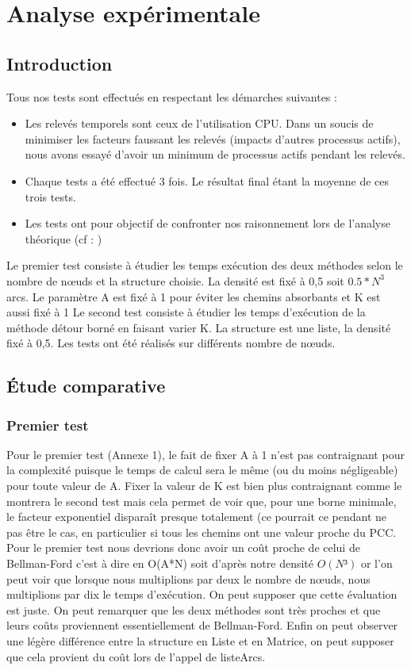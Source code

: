 \chapter{Analyse expérimentale}
\section{Introduction}
Tous nos tests sont effectués en respectant les démarches suivantes : 
\begin{itemize}
\item
Les relevés temporels sont ceux de l'utilisation CPU. Dans un soucis de minimiser les facteurs faussant les relevés (impacts d'autres processus actifs), nous avons essayé d'avoir un minimum de processus actifs pendant les relevés.
\item
Chaque tests a été effectué 3 fois. Le résultat final étant la moyenne de ces trois tests.
\item
Les tests ont pour objectif de confronter nos raisonnement lors de l'analyse théorique (cf : )

\end{itemize}
Le premier test consiste à étudier les temps exécution des deux méthodes selon le nombre de nœuds et la structure choisie. La densité est fixé à 0,5 soit $0.5*N^3$ arcs. Le paramètre A est fixé à 1 pour éviter les chemins absorbants et K est aussi fixé à 1
Le second test consiste à étudier les temps d'exécution de la méthode détour borné en faisant varier K. La structure est une liste, la densité fixé à 0,5. Les tests ont été réalisés sur différents nombre de nœuds.
\section{Étude comparative}
\subsection{Premier test}
Pour le premier test (Annexe 1), le fait de fixer A à 1 n'est pas contraignant pour la complexité puisque le temps de calcul sera le même (ou du moins négligeable) pour toute valeur de A. Fixer la valeur de K est bien plus contraignant comme le montrera le second test mais cela permet de voir que, pour une borne minimale, le facteur exponentiel disparaît presque totalement (ce pourrait ce pendant ne pas être le cas, en particulier si tous les chemins ont une valeur proche du PCC. Pour le premier test nous devrions donc avoir un coût proche de celui de Bellman-Ford c'est à dire en O(A*N) soit d'après notre densité $O(N³)$ or l'on peut voir que lorsque nous multiplions par deux le nombre de nœuds, nous multiplions par dix le temps d'exécution. On peut supposer que cette évaluation est juste. On peut remarquer que les deux méthodes sont très proches et que leurs coûts proviennent essentiellement de Bellman-Ford. Enfin on peut observer une légère différence entre la structure en Liste et en Matrice, on peut supposer que cela provient du coût lors de l'appel de listeArcs. 
